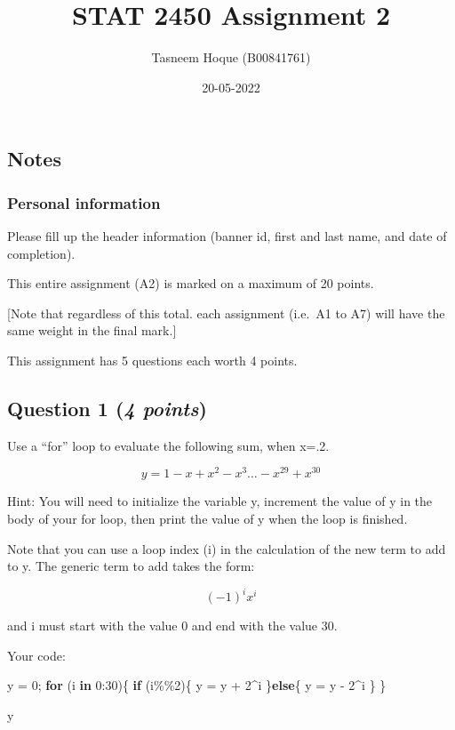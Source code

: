\documentclass[
]{article}
\title{STAT 2450 Assignment 2}
\author{Tasneem Hoque (B00841761)}
\date{20-05-2022}
\newenvironment{Shaded}{\begin{snugshade}}{\end{snugshade}}
\newcommand{\ControlFlowTok}[1]{\textcolor[rgb]{0.13,0.29,0.53}{\textbf{#1}}}
\newcommand{\DecValTok}[1]{\textcolor[rgb]{0.00,0.00,0.81}{#1}}
\newcommand{\NormalTok}[1]{#1}
\newcommand{\OtherTok}[1]{\textcolor[rgb]{0.56,0.35,0.01}{#1}}
\newcommand{\SpecialCharTok}[1]{\textcolor[rgb]{0.00,0.00,0.00}{#1}}
\begin{document}
\maketitle

\hypertarget{notes}{%
\subsection{Notes}\label{notes}}

\hypertarget{personal-information}{%
\subsubsection{Personal information}\label{personal-information}}

Please fill up the header information (banner id, first and last name,
and date of completion).

This entire assignment (A2) is marked on a maximum of 20 points.

{[}Note that regardless of this total. each assignment (i.e.~A1 to A7)
will have the same weight in the final mark.{]}

This assignment has 5 questions each worth 4 points.

\hypertarget{question-1-4-points}{%
\subsection{\texorpdfstring{Question 1 (\emph{4
points})}{Question 1 (4 points)}}\label{question-1-4-points}}

Use a ``for'' loop to evaluate the following sum, when x=.2.

\[y=1-x+x^2-x^3 \ldots -x^{29}+x^{30}\]

Hint: You will need to initialize the variable y, increment the value of
y in the body of your for loop, then print the value of y when the loop
is finished.

Note that you can use a loop index (i) in the calculation of the new
term to add to y. The generic term to add takes the form:

\[(-1)^i  x^i\]

and i must start with the value 0 and end with the value 30.

Your code:

\begin{Shaded}
\begin{Highlighting}[]
\NormalTok{y }\OtherTok{=} \DecValTok{0}\NormalTok{;}
\ControlFlowTok{for}\NormalTok{ (i }\ControlFlowTok{in} \DecValTok{0}\SpecialCharTok{:}\DecValTok{30}\NormalTok{)\{}
  \ControlFlowTok{if}\NormalTok{ (i}\SpecialCharTok{\%\%}\DecValTok{2}\NormalTok{)\{}
\NormalTok{    y }\OtherTok{=}\NormalTok{ y }\SpecialCharTok{+} \DecValTok{2}\SpecialCharTok{\^{}}\NormalTok{i}
\NormalTok{  \}}\ControlFlowTok{else}\NormalTok{\{}
\NormalTok{    y }\OtherTok{=}\NormalTok{ y }\SpecialCharTok{{-}} \DecValTok{2}\SpecialCharTok{\^{}}\NormalTok{i}
\NormalTok{  \}}
\NormalTok{\}}

\NormalTok{y}
\end{Highlighting}
\end{Shaded}
\end{document}
